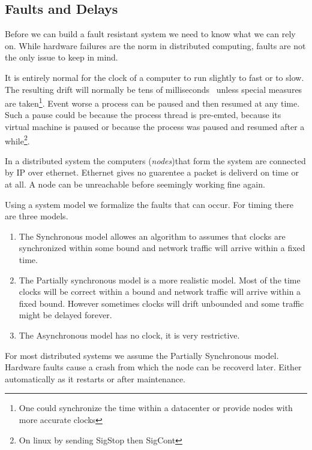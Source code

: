 \subsection{Faults and Delays} \label{sec:faults}
Before we can build a fault resistant system we need to know what we can rely on. While hardware failures are the norm in distributed computing, faults are not the only issue to keep in mind. 

It is entirely normal for the clock of a computer to run slightly to fast or to slow. The resulting drift will normally be tens of milliseconds~\cite{time} unless special measures are taken\footnote{One could synchronize the time within a datacenter or provide nodes with more accurate clocks}. Event worse a process can be paused and then resumed at any time. Such a pause could be because the process thread is pre-emted, because its virtual machine is paused or because the process was paused and resumed after a while\footnote{On linux by sending SigStop then SigCont}. 

In a distributed system the computers (\textit{nodes})that form the system are connected by IP over ethernet. Ethernet gives no guarentee a packet is deliverd on time or at all. A node can be unreachable before seemingly working fine again.

Using a system model we formalize the faults that can occur. For timing there are three models. 
\begin{enumerate}
	\item The Synchronous model allowes an algorithm to assumes that clocks are synchronized within some bound and network traffic will arrive within a fixed time.
	\item The Partially synchronous model is a more realistic model. Most of the time clocks will be correct within a bound and network traffic will arrive within a fixed bound. However sometimes clocks will drift unbounded and some traffic might be delayed forever.
	\item The Asynchronous model has no clock, it is very restrictive.
\end{enumerate}

For most distributed systems we assume the Partially Synchronous model. Hardware faults cause a crash from which the node can be recoverd later. Either automatically as it restarts or after maintenance.
